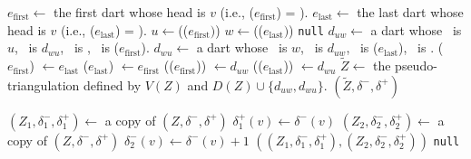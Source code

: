 \documentclass[main.tex]{subfiles}
\begin{document}
\begin{algorithm}[H]
    \caption{\addBoundaryDartsWithLink($(Z, \delta^-, \delta^+), v$)}
    \label{alg:add_boundary_darts}
    \begin{algorithmic}[1]
        \State $e_{\text{first}} \gets$ the first dart whose head is $v$ (i.e., \predecessor($e_{\text{first}}$) = \nil).
        \State $e_{\text{last}} \gets$ the last dart whose head is $v$ (i.e., \successor($e_{\text{last}}$) = \nil).
        \State $u \gets $\head(\reverse($e_{\text{first}})$)
        \State $w \gets $\head(\reverse($e_{\text{last}})$)
            \State \Return \texttt{null} 
        \EndIf
        \State $d_{uw} \gets $ a dart whose \head\ is $u$, \reverse\ is $d_{wu}$, \successor\ is \nil, \predecessor\ is \reverse($e_{\text{first}}$).
        \State $d_{wu} \gets $ a dart whose \head\ is $w$, \reverse\ is $d_{uw}$, \successor\ is \reverse($e_{\text{last}}$), \predecessor\ is \nil.
        \State \predecessor($e_{\text{first}}$) $\gets e_{\text{last}}$
        \State \successor($e_{\text{last}}$) $\gets e_{\text{first}}$
        \State \successor(\reverse($e_{\text{first}}$)) $\gets d_{uw}$
        \State \predecessor(\reverse($e_{\text{last}}$)) $\gets d_{wu}$
        \State $\tilde{Z} \gets$ the pseudo-triangulation defined by $V(Z)$ and $D(Z) \cup \{d_{uw}, d_{wu}\}$.
        \State \Return $(\tilde{Z}, \delta^-, \delta^+)$
    \end{algorithmic}
\end{algorithm}

\begin{algorithm}[H]
    \caption{\singleOutLowerDegreeWithLink($Z, \delta^-, \delta^+)$}
    \label{alg:single_out_lower_deg}
    \begin{algorithmic}[1]
                \State $(Z_1, \delta^-_1, \delta^+_1) \gets$ a copy of $(Z, \delta^-, \delta^+)$
                \State $\delta^+_1(v) \gets \delta^-(v)$
                \State $(Z_2, \delta^-_2, \delta^+_2) \gets$ a copy of $(Z, \delta^-, \delta^+)$
                \State $\delta^-_2(v) \gets \delta^-(v) + 1$
                \State \Return $((Z_1, \delta_1^-, \delta_1^+), (Z_2, \delta^-_2, \delta^+_2))$
            \EndIf
        \EndFor
        \State \Return \texttt{null}
    \end{algorithmic}
\end{algorithm}
\end{document}
